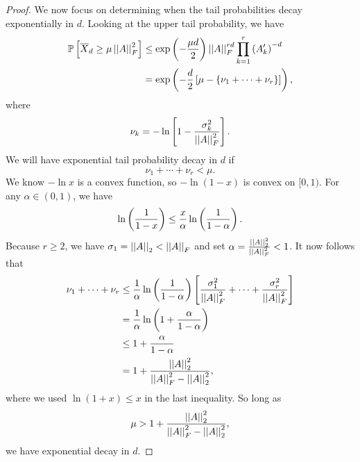 \begin{proof}
We now focus on determining when the tail probabilities decay
exponentially in $d$.
Looking at the upper tail probability, we have
%
\begin{align}
    \mathbb{P}\left[ \overline{X}_{d}\ge \mu\left| \left| A \right| \right|_{F}^{2} \right]
    &\le \exp\left( -\frac{\mu d}{2} \right)\left| \left| A \right| \right|_{F}^{rd} \prod_{k=1}^{r}
        \left( A_{k}' \right)^{-d} \nonumber\\
    &= \exp\left( -\frac{d}{2}\left[ \mu-\left\{ \nu_{1}+\cdots+\nu_{r} \right\} \right] \right),
\end{align}
%
where
%
\begin{equation}
    \nu_{k} = -\ln\left[ 1-\frac{\sigma_{k}^{2}}{\left| \left| A \right| \right|_{F}^{2}} \right].
\end{equation}
%
We will have exponential tail probability decay in $d$ if
%
\begin{equation}
    \nu_{1} + \cdots + \nu_{r} < \mu.
\end{equation}
%
We know $-\ln x$ is a convex function, so $-\ln(1-x)$ is convex on $[0,1)$.
For any $\alpha\in(0,1)$, we have
%
\begin{equation}
    \ln\left( \frac{1}{1-x} \right)\le\frac{x}{\alpha}\ln\left( \frac{1}{1-\alpha} \right).
\end{equation}
%
Because $r\ge2$, we have $\sigma_{1} = \left| \left| A \right| \right|_{2} < \left| \left| A \right| \right|_{F}$ and
set $\alpha = \frac{\left| \left| A \right| \right|_{2}^{2}}{\left| \left| A \right| \right|_{F}^{2}} < 1$.
It now follows that
%
\begin{align}
    \nu_{1} + \cdots + \nu_{r}
        &\le \frac{1}{\alpha}\ln\left( \frac{1}{1-\alpha} \right)
            \left[ \frac{\sigma_{1}^{2}}{\left| \left| A \right| \right|_{F}^{2}} + \cdots +
            \frac{\sigma_{r}^{2}}{\left| \left| A \right| \right|_{F}^{2}} \right] \nonumber\\
    &= \frac{1}{\alpha}\ln\left( 1 + \frac{\alpha}{1-\alpha} \right) \nonumber\\
    &\le 1 + \frac{\alpha}{1-\alpha} \nonumber\\
    &= 1 + \frac{\left| \left| A \right| \right|_{2}^{2}}{\left| \left| A \right| \right|_{F}^{2} - \left| \left| A \right| \right|_{2}^{2}},
\end{align}
%
where we used $\ln(1+x)\le x$ in the last inequality.
So long as
%
\begin{equation}
    \mu > 1 + \frac{\left| \left| A \right| \right|_{2}^{2}}{\left| \left| A \right| \right|_{F}^{2} - \left| \left| A \right| \right|_{2}^{2}},
\end{equation}
%
we have exponential decay in $d$.


\end{proof}
